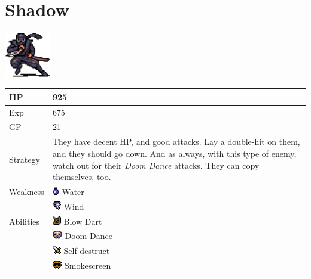 \section{Shadow}
\label{monster:shadow}

\includegraphics[height=2cm,keepaspectratio]{./resources/monster/shadow}

\begin{longtable}{ l p{9cm} }
	HP
	& 925
\\ \hline
	Exp
	& 675
\\ \hline
	GP
	& 21
\\ \hline
	Strategy
	& They have decent HP, and good attacks. Lay a double-hit on them, and they should go down. And as always, with this type of enemy, watch out for their \textit{Doom Dance} attacks. They can copy themselves, too.
\\ \hline
	Weakness
	& \includegraphics[height=1em,keepaspectratio]{./resources/effects/water} Water \\
	& \includegraphics[height=1em,keepaspectratio]{./resources/effects/wind} Wind
\\ \hline
	Abilities
	& \includegraphics[height=1em,keepaspectratio]{./resources/effects/shoot} Blow Dart \\
	& \includegraphics[height=1em,keepaspectratio]{./resources/effects/fatal} Doom Dance \\
	& \includegraphics[height=1em,keepaspectratio]{./resources/effects/damage} Self-destruct \\
	& \includegraphics[height=1em,keepaspectratio]{./resources/effects/blind} Smokescreen
\end{longtable}
